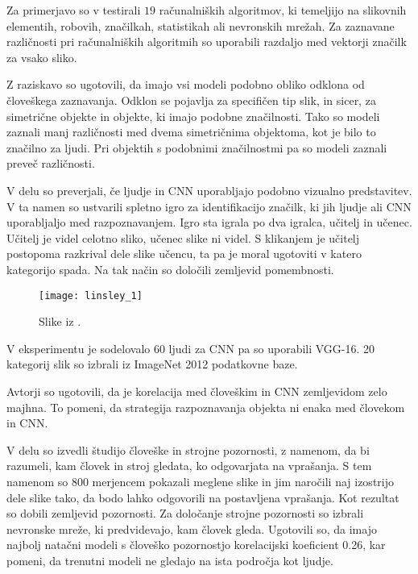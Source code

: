 Za primerjavo so v \cite{pramod2016computational} testirali $19$ računalniških algoritmov, ki temeljijo na slikovnih elementih, robovih, značilkah, statistikah ali nevronskih mrežah. Za zaznavane različnosti pri računalniških algoritmih so uporabili razdaljo med vektorji značilk za vsako sliko. 

Z raziskavo so ugotovili, da imajo vsi modeli podobno obliko odklona od človeškega zaznavanja. Odklon se pojavlja za specifičen tip slik, in sicer, za simetrične objekte in objekte, ki imajo podobne značilnosti. Tako so modeli zaznali manj različnosti med dvema simetričnima objektoma, kot je bilo to značilno za ljudi. Pri objektih s podobnimi značilnostmi pa so modeli zaznali preveč različnosti. 

V delu \cite{linsley2017visual} so preverjali, če ljudje in CNN uporabljajo podobno vizualno predstavitev. V ta namen so ustvarili spletno igro za identifikacijo značilk, ki jih ljudje ali CNN uporabljaljo med razpoznavanjem. Igro sta igrala po dva igralca, učitelj in učenec. Učitelj je videl celotno sliko, učenec slike ni videl. S klikanjem je učitelj postopoma razkrival dele slike učencu, ta pa je moral ugotoviti v katero kategorijo spada. Na tak način so določili zemljevid pomembnosti.

\begin{figure}[!htbp]
	\centering
	\texttt{[image: linsley\_1]}
	\caption{Slike iz \cite{deng2009imagenet}.}
\end{figure}

V eksperimentu je sodelovalo $60$ ljudi za CNN pa so uporabili VGG-16. 20 kategorij slik so izbrali iz ImageNet 2012 podatkovne baze. 

Avtorji so ugotovili, da je korelacija med človeškim in CNN zemljevidom zelo majhna. To pomeni, da strategija razpoznavanja objekta ni enaka med človekom in CNN. 

V delu \cite{das2017human} so izvedli študijo človeške in strojne pozornosti, z namenom, da bi razumeli, kam človek in stroj gledata, ko odgovarjata na vprašanja. S tem namenom so $800$ merjencem pokazali meglene slike in jim naročili naj izostrijo dele slike tako, da bodo lahko odgovorili na postavljena vprašanja. Kot rezultat so dobili zemljevid pozornosti. Za določanje strojne pozornosti so izbrali nevronske mreže, ki predvidevajo, kam človek gleda. Ugotovili so, da imajo najbolj natačni modeli s človeško pozornostjo korelacijski koeficient \num{0.26}, kar pomeni, da trenutni modeli ne gledajo na ista področja kot ljudje. 


